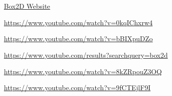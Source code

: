 \documentclass{article}
\begin{document}
\section*{}
\hfill
\begin{thebibliography}{7}

\href{''http://box2d.org/''}{Box2D Website}

\href{''https://www.youtube.com/watch?v=0kqIChxrw-4''}{https://www.youtube.com/watch?v=0kqIChxrw4}

\href{''https://www.youtube.com/watch?v=bBIXpu-D_Zo''}{https://www.youtube.com/watch?v=bBIXpuDZo}

\href{''https://www.youtube.com/results?search_query=box2d''}{https://www.youtube.com/results?searchquery=box2d}
 
\href{''https://www.youtube.com/watch?v=8kZRpouZ3OQ''}{https://www.youtube.com/watch?v=8kZRpouZ3OQ}

\href{''https://www.youtube.com/watch?v=9fCT-EjlF9I''}{https://www.youtube.com/watch?v=9fCTEjlF9I}

\end{thebibliography}
\clearpage
\end{document}
